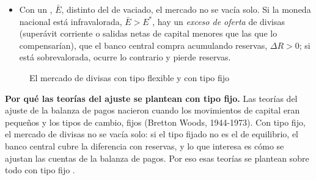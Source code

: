 \documentclass[11pt]{article}
\begin{document}
\begin{itemize}
\begin{align}
  \underbrace{X+\text{entradas de capital}}_{\text{oferta de divisas}}&=\underbrace{M+\text{salidas de capital}}_{\text{demanda de divisas}}\nonumber\\
  \Longleftrightarrow\qquad\underbrace{X-M}_{\mathrm{CC}}&=\underbrace{\text{salidas}-\text{entradas de capital}}_{\mathrm{CF}} ,\label{eq:vaciado}
  \end{align}
  donde CC es la cuenta corriente y CF la cuenta financiera (en términos netos, sin variación de reservas) .
  \begin{itemize}
  \item Sin movimientos de capital, la flexibilidad del tipo de cambio equilibraría la cuenta corriente: $\mathrm{CF}=0\Rightarrow\mathrm{CC}=0$. Ocurría, aproximadamente, durante Bretton Woods (1944-1973), cuando la mayoría de los países mantenía controles de capital. Pero los movimientos de capital no son nuevos: fueron muy grandes bajo el patrón oro (1870-1914), se hundieron entre las guerras y con Bretton Woods y volvieron con la liberalización de los años 70~y 80\nocite{ObstfeldTaylor2004Global}.
  \item Hoy, con capitales móviles, un tipo flexible es compatible con desequilibrios persistentes de la cuenta corriente, financiados con la cuenta financiera.
  \end{itemize}
\item Con un , $\bar E$, distinto del de vaciado, el mercado no se vacía solo. Si la moneda nacional está infravalorada, $\bar E>E^{*}$, hay un \emph{exceso de oferta} de divisas (superávit corriente o salidas netas de capital menores que las que lo compensarían), que el banco central compra acumulando reservas, $\Delta R>0$; si está sobrevalorada, ocurre lo contrario y pierde reservas.
\end{itemize}

\begin{figure}[H]
\centering
\caption{El mercado de divisas con tipo flexible y con tipo fijo}\label{fig:oferta-demanda-divisas}
\end{figure}

\begin{anotaciones}
\textbf{Por qué las teorías del ajuste se plantean con tipo fijo.} Las teorías del ajuste de la balanza de pagos nacieron cuando los movimientos de capital eran pequeños y los tipos de cambio, fijos (Bretton Woods, 1944-1973). Con tipo fijo, el mercado de divisas no se vacía solo: si el tipo fijado no es el de equilibrio, el banco central cubre la diferencia con reservas, y lo que interesa es cómo se ajustan las cuentas de la balanza de pagos. Por eso esas teorías se plantean sobre todo con tipo fijo .
\end{anotaciones}
\end{document}
